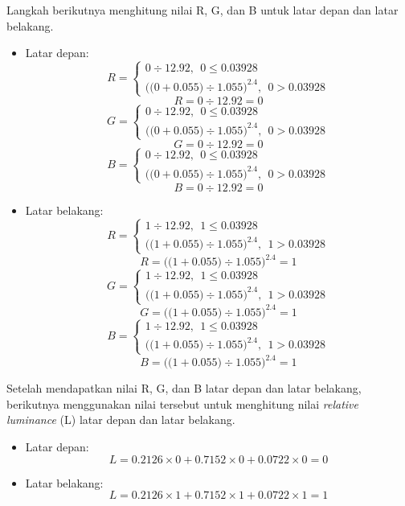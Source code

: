 Langkah berikutnya menghitung nilai R, G, dan B untuk latar depan dan latar belakang.

\begin{itemize}
	\item Latar depan:
			\[
				R=\left\{
				\begin{array}{rr}
				0\div 12.92,\ \ 0\le 0.03928 \\ 
				{{((0}+0.055)\div 1.055)}^{2.4},\ \ 0>0.03928
				\end{array}
				\right.
			\]
			\[
				R=0\div 12.92 = 0
			\]
			\[
				G=\left\{
				\begin{array}{rr}
				0\div 12.92,\ \ 0\le 0.03928 \\ 
				{{((0}+0.055)\div 1.055)}^{2.4},\ \ 0>0.03928
				\end{array}
				\right.
			\]
			\[
				G=0\div 12.92 = 0
			\]
			\[
				B=\left\{
				\begin{array}{rr}
				0\div 12.92,\ \ 0\le 0.03928 \\ 
				{{((0}+0.055)\div 1.055)}^{2.4},\ \ 0>0.03928
				\end{array}
				\right.
			\]
			\[
				B=0\div 12.92 = 0
			\]
	\item Latar belakang:
			\[
				R=\left\{
				\begin{array}{rr}
				1\div 12.92,\ \ 1\le 0.03928 \\ 
				{{((1}+0.055)\div 1.055)}^{2.4},\ \ 1>0.03928
				\end{array}
				\right.
			\]
			\[
				R={{((1}+0.055)\div 1.055)}^{2.4} = 1
			\]
			\[
				G=\left\{
				\begin{array}{rr}
				1\div 12.92,\ \ 1\le 0.03928 \\ 
				{{((1}+0.055)\div 1.055)}^{2.4},\ \ 1>0.03928
				\end{array}
				\right.
			\]
			\[
				G={{((1}+0.055)\div 1.055)}^{2.4} = 1
			\]
			\[
				B=\left\{
				\begin{array}{rr}
				1\div 12.92,\ \ 1\le 0.03928 \\ 
				{{((1}+0.055)\div 1.055)}^{2.4},\ \ 1>0.03928
				\end{array}
				\right.
			\]
			\[
				B={{((1}+0.055)\div 1.055)}^{2.4} = 1
			\]
\end{itemize}

Setelah mendapatkan nilai R, G, dan B latar depan dan latar belakang, berikutnya menggunakan nilai tersebut untuk menghitung nilai \textit{relative luminance} (L) latar depan dan latar belakang.

\begin{itemize}
	\item Latar depan:
		\[
			L = 0.2126 \times 0 + 0.7152 \times 0 + 0.0722 \times 0 = 0
		\]
	\item Latar belakang:
		\[
			L = 0.2126 \times 1 + 0.7152 \times 1 + 0.0722 \times 1 = 1
		\]
\end{itemize}

